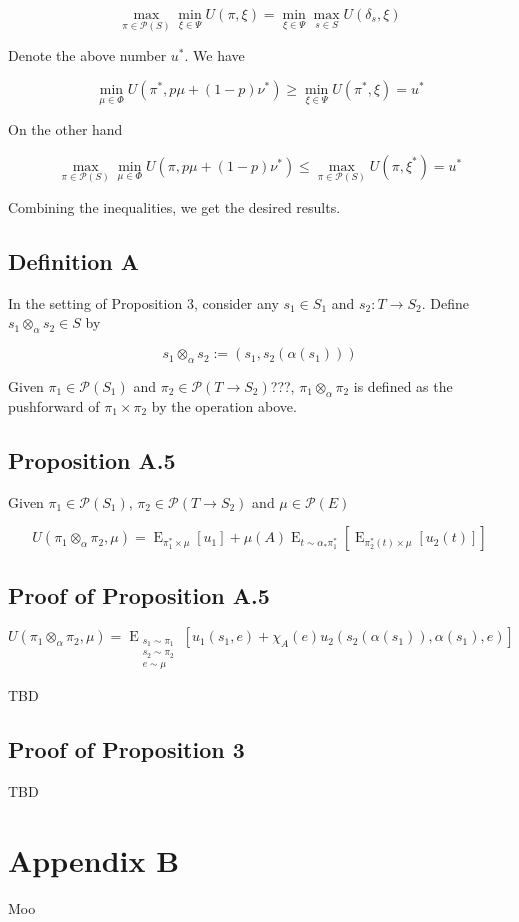 \documentclass[a4paper]{article}
\DeclareMathOperator{\E}{E}
\newcommand{\EEE}[3]{\operatorname{E}_{\substack{#1 \\ #2 \\ #3}}}
\newcommand{\Prob}{\mathcal{P}}
\begin{document}
$$\max_{\pi \in \Prob(S)} \min_{\xi \in \Psi} U(\pi,\xi) = \min_{\xi \in \Psi} \max_{s \in S} U(\delta_s,\xi)$$

Denote the above number ${u^*}$. We have

$$\min_{\mu \in \Phi} U(\pi^*,p\mu + (1-p)\nu^*) \geq \min_{\xi \in \Psi} U(\pi^*,\xi)=u^*$$

On the other hand

$$\max_{\pi \in \Prob(S)} \min_{\mu \in \Phi} U(\pi,p\mu + (1-p)\nu^*) \leq \max_{\pi \in \Prob(S)}  U(\pi,\xi^*)=u^*$$

Combining the inequalities, we get the desired results.

\subsection{Definition A}

In the setting of Proposition 3, consider any ${s_1 \in S_1}$ and ${s_2: T \rightarrow S_2}$. Define ${s_1 \otimes_\alpha s_2 \in S}$ by

$$s_1 \otimes_\alpha s_2:=(s_1,s_2(\alpha(s_1)))$$

Given ${\pi_1 \in \Prob(S_1)}$ and ${\pi_2 \in \Prob(T \rightarrow S_2)}$???, ${\pi_1 \otimes_\alpha \pi_2}$ is defined as the pushforward of ${\pi_1 \times \pi_2}$ by the operation above.

\subsection{Proposition A.5}

Given ${\pi_1 \in \Prob(S_1)}$, ${\pi_2 \in \Prob(T \rightarrow S_2)}$ and ${\mu \in \Prob(E)}$

$$U(\pi_1 \otimes_\alpha \pi_2, \mu) = \E_{\pi_1^* \times \mu}[u_1] + \mu(A) \E_{t \sim \alpha_*\pi_1^*}[\E_{\pi_2^*(t) \times \mu}[u_2(t)]]$$

\subsection{Proof of Proposition A.5}

$$U(\pi_1 \otimes_\alpha \pi_2, \mu) = \EEE{s_1 \sim \pi_1}{s_2 \sim \pi_2}{e \sim \mu}[u_1(s_1,e)+\chi_A(e)u_2(s_2(\alpha(s_1)),\alpha(s_1),e)]$$

TBD

\subsection{Proof of Proposition 3}

TBD

\section{Appendix B}

Moo
\end{document}
